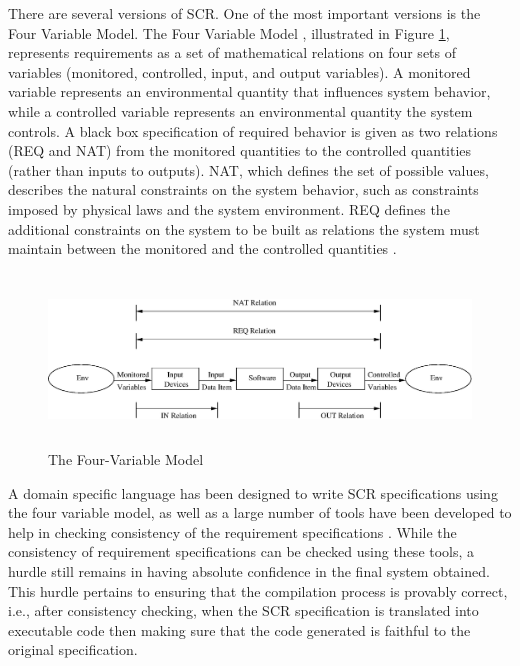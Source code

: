\documentclass{entcs}
\begin{document}
There are several versions of SCR. One of the most important versions is the Four Variable Model. 
The Four Variable Model \cite{FAULK89}, illustrated in Figure \ref{actual4}, represents requirements 
as a set of mathematical relations on four sets of variables (monitored, controlled, input, 
and output variables). A monitored variable 
represents an environmental quantity that influences system behavior, while a controlled variable represents
an environmental quantity the system controls. A black box specification of required behavior is given as two relations 
(REQ and NAT) from the monitored quantities to the controlled quantities (rather than inputs to outputs). NAT,
which defines the set of possible values, describes the natural constraints on the system behavior, 
such as constraints imposed by physical laws and the system environment. REQ defines the additional 
constraints on the system to be built as relations the system must maintain between the monitored and 
the controlled quantities \cite{Constance96}. 

\begin{figure}
\begin{center}
  \includegraphics[height=1.8in,width=5in]{fig5.eps}
  \caption{The Four-Variable Model}
  \label{actual4}
\end{center}
\end{figure} 


A domain specific language \cite{Elizabeth02} has been designed to write SCR specifications
using the four variable model, as well as a large number of tools have been developed to
help in checking consistency of the requirement specifications \cite{Constance96}. 
While the consistency of requirement specifications can be checked using these tools, a 
hurdle still remains in having absolute confidence in the final system obtained. This hurdle
pertains to ensuring that the compilation process is provably correct, i.e., after
consistency checking, when the
SCR specification is translated into executable code then making sure that 
the code generated is faithful to the original specification.
\end{document}
